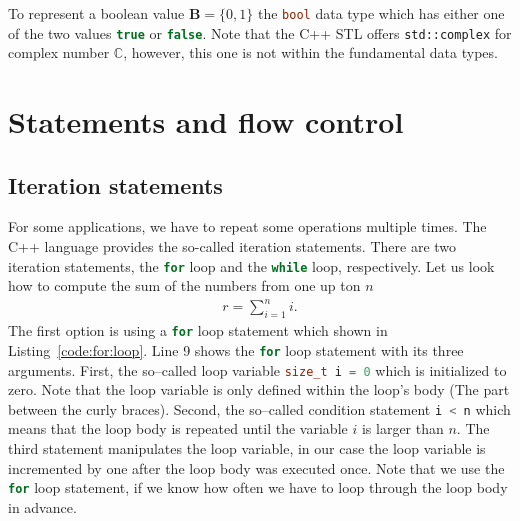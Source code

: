 To represent a boolean value $\mathbf{B}=\{0,1\}$ the \lstinline[language=C++]|bool| data type which has either one of the two values \lstinline[language=C++]|true| or \lstinline[language=C++]|false|. Note that the C++ STL offers \lstinline|std::complex| for complex number $\mathbb{C}$, however, this one is not within the fundamental data types.

\section{Statements and flow control}

\subsection{Iteration statements}
\label{sec:iteration:statements}
 For some applications, we have to repeat some operations multiple times. The C++ language provides the so-called iteration statements. There are two iteration statements, the \lstinline[language=C++]|for| loop and the \lstinline[language=C++]|while| loop, respectively. Let us look how to compute the sum of the numbers from one up ton $n$
\begin{align}
r = \sum\limits_{i=1}^n i\text{.}
\end{align}
The first option is using a \lstinline[language=C++]|for| loop statement which shown in Listing~\ref{code:for:loop}. Line 9 shows the \lstinline[language=C++]|for| loop statement with its three arguments. First, the so--called loop variable \lstinline[language=C++]{size_t i = 0} which is initialized to zero. Note that the loop variable is only defined within the loop's body (The part between the curly braces). Second, the so--called condition statement \lstinline[language=C++]{i < n} which means that the loop body is repeated until the variable $i$ is larger than $n$. The third statement manipulates the loop variable, in our case the loop variable is incremented by one after the loop body was executed once. Note that we use the \lstinline[language=C++]|for| loop statement, if we know how often we have to loop through the loop body in advance.


